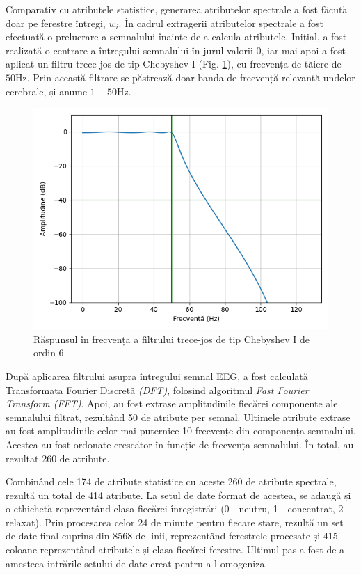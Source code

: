 Comparativ cu atributele statistice, generarea atributelor spectrale a fost făcută doar pe ferestre întregi, $w_i$. În cadrul extragerii atributelor spectrale a fost efectuată o prelucrare a semnalului înainte de a calcula atributele. Inițial, a fost realizată o centrare a întregului semnalului în jurul valorii $0$, iar mai apoi a fost aplicat un filtru trece-jos de tip Chebyshev I (Fig. \ref{fig:cheb1-filt}), cu frecvența de tăiere de $50\si{\hertz}$. Prin această filtrare se păstrează doar banda de frecvență relevantă undelor cerebrale, și anume $1-50\si{\hertz}$.
\begin{figure}[ht]
\centering
\includegraphics[width=\textwidth, keepaspectratio]{fig/cap3/cheb1-filt.png}
\caption{Răspunsul în frecvența a filtrului trece-jos de tip Chebyshev I de ordin 6}
\label{fig:cheb1-filt}
\end{figure}

După aplicarea filtrului asupra întregului semnal EEG, a fost calculată Transformata Fourier Discretă \textit{(DFT)}, folosind algoritmul \textit{Fast Fourier Transform (FFT)}. Apoi, au fost extrase amplitudinile fiecărei componente ale semnalului filtrat, rezultând 50 de atribute per semnal. Ultimele atribute extrase au fost amplitudinile celor mai puternice 10 frecvențe din componența semnalului. Acestea au fost ordonate crescător în funcție de frecvența semnalului. În total, au rezultat 260 de atribute.

Combinând cele 174 de atribute statistice cu aceste 260 de atribute spectrale, rezultă un total de 414 atribute. La setul de date format de acestea, se adaugă și o ethichetă reprezentând clasa fiecărei înregistrări (0 - neutru, 1 - concentrat, 2 - relaxat). Prin procesarea celor 24 de minute pentru fiecare stare, rezultă un set de date final cuprins din 8568 de linii, reprezentând ferestrele procesate și 415 coloane reprezentând atributele și clasa fiecărei ferestre. Ultimul pas a fost de a amesteca intrările setului de date creat pentru a-l omogeniza.

